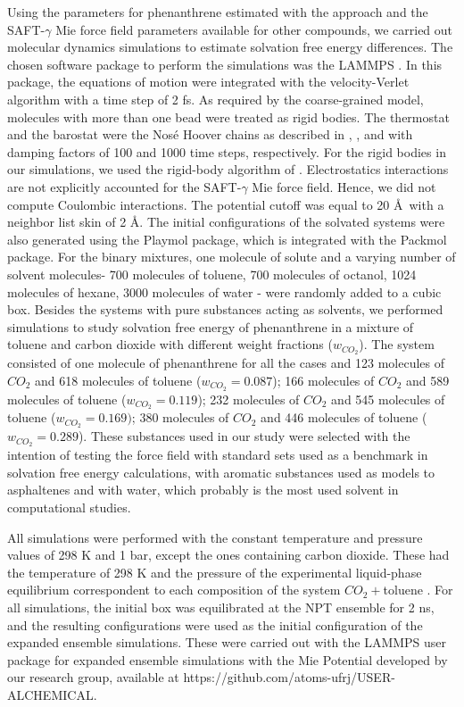 Using the parameters for phenanthrene estimated with the  approach and the SAFT-$\gamma$ Mie force field parameters available for other compounds, we carried out molecular dynamics simulations to estimate solvation free energy differences. The chosen software package to perform the simulations was the LAMMPS  \cite{lammps}. In this package, the equations of motion were integrated with the velocity-Verlet algorithm \cite{verlet} with a time step of 2 fs. As required by the coarse-grained model,  molecules with more than one bead were treated as rigid bodies. The thermostat and the barostat were the Nos\'{e} Hoover chains as described in , , and  with damping factors of 100 and 1000 time steps, respectively. For the rigid bodies in our simulations, we used the rigid-body algorithm of . Electrostatics interactions are not explicitly accounted for the SAFT-$\gamma$ Mie force field. Hence, we did not compute Coulombic interactions. The potential cutoff was equal to 20 \AA $\,$ \cite{muller2017} with a neighbor list skin of 2 \AA. The initial configurations of the solvated systems were also generated using the Playmol package, which is integrated with the Packmol package. For the binary mixtures, one molecule of solute and a varying number of solvent molecules- 700 molecules of toluene, 700 molecules of octanol, 1024 molecules of hexane, 3000 molecules of water - were randomly added to a cubic box. Besides the systems with pure substances acting as solvents, we performed simulations to study solvation free energy of phenanthrene in a mixture of toluene and carbon dioxide with different weight fractions ($w_{CO_{2}}$). The  system consisted of one molecule of phenanthrene for all the cases and 123 molecules of $CO_{2}$ and 618 molecules of toluene ($w_{CO_{2}} = 0.087$); 166 molecules of $CO_{2}$ and 589 molecules of toluene ($w_{CO_{2}} = 0.119$); 232 molecules of $CO_{2}$ and 545 molecules of toluene ($w_{CO_{2}} = 0.169)$; 380 molecules of $CO_{2}$ and 446 molecules of toluene ($w_{CO_{2}} = 0.289$). These substances used in our study were selected with the intention of testing the force field with standard sets used as a benchmark in solvation free energy calculations, with aromatic substances used as models to asphaltenes and with water, which probably is the most used solvent in computational studies.

All simulations were performed with the constant temperature and pressure values of 298 K and 1 bar, except the ones containing carbon dioxide. These had the temperature of 298 K and the pressure of the experimental liquid-phase equilibrium correspondent to each composition of the system $CO_{2}+$toluene \cite{co2toliq}. For all simulations, the initial box was equilibrated at the NPT ensemble for 2 ns, and the resulting configurations were used as the initial configuration of the expanded ensemble simulations. These were carried out with the LAMMPS user package for expanded ensemble simulations with the Mie Potential developed by our research group, available at https://github.com/atoms-ufrj/USER-ALCHEMICAL. 

